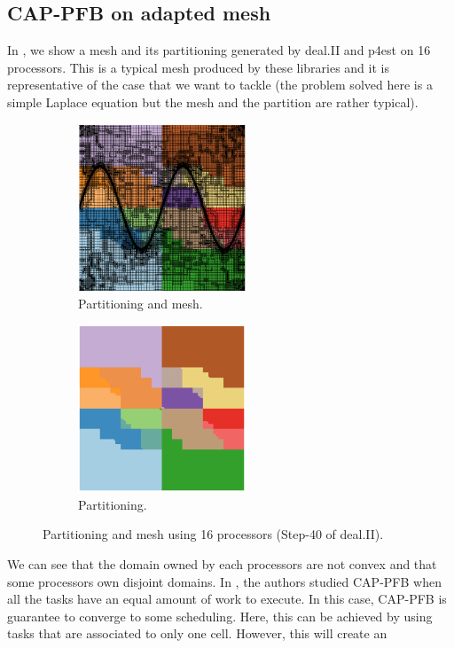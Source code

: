 \documentclass[letterpaper]{article}
\renewcommand{\(}{\left(}
\renewcommand{\)}{\right)}
\renewcommand{\[}{\left[}
\renewcommand{\]}{\right]}
\begin{document}
\subsection{CAP-PFB on adapted mesh}
In , we show a mesh and its partitioning generated by deal.II and p4est 
on 16 processors. This is a typical mesh produced by these libraries and it is
representative of the case that we want to tackle (the problem solved here is a
simple Laplace equation but the mesh and the partition are rather typical). 
\begin{figure}[H]
  \begin{subfigure}[b]{.5\textwidth}
    \centering
    \includegraphics[width=5cm]{subdomain_id_0}
    \caption{Partitioning and mesh.}
  \end{subfigure}
  \begin{subfigure}[b]{.5\textwidth}
    \centering
    \includegraphics[width=5cm]{subdomain_id_1}
    \caption{Partitioning.}
  \end{subfigure}
  \caption{Partitioning and mesh using 16 processors (Step-40 of deal.II).}
  \label{subdomain_id}
\end{figure}
We can see that the domain owned by each processors are not convex and that some
processors own disjoint domains. In \cite{Mo2014}, the authors studied CAP-PFB
when all the tasks have an equal amount of work to execute. In this case,
CAP-PFB is guarantee to converge to some scheduling. Here, this can be achieved by using
tasks that are associated to only one cell. However, this will create an
\end{document}
